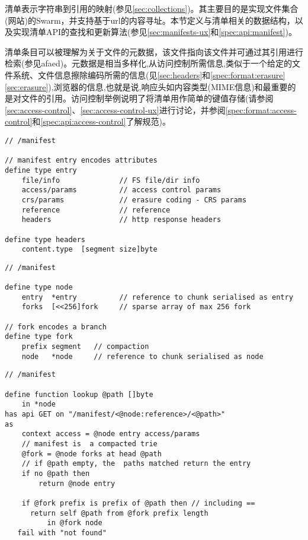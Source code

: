 清单表示字符串到引用的映射(参见\ref{sec:collections})。其主要目的是实现文件集合(网站)的Swarm，并支持基于url的内容寻址。本节定义与清单相关的数据结构，以及实现清单API的查找和更新算法(参见\ref{sec:manifests-ux}和\ref{spec:api:manifest})。

清单条目可以被理解为关于文件的元数据，该文件指向该文件并可通过其引用进行检索(参见afaed)。元数据是相当多样化,从访问控制所需信息,类似于一个给定的文件系统、文件信息擦除编码所需的信息(见\ref{sec:headers}和\ref{spec:format:erasure} \ref{sec:erasure}),浏览器的信息,也就是说,响应头如内容类型(MIME信息)和最重要的是对文件的引用。访问控制举例说明了将清单用作简单的键值存储(请参阅\ref{sec:access-control}、\ref{sec:access-control-ux}进行讨论，并参阅\ref{spec:format:access-control}和\ref{spec:api:access-control}了解规范)。

\begin{definition}\label{def:manifest-entry}
\begin{lstlisting}[language=buzz1]
// /manifest

// manifest entry encodes attributes 
define type entry 
    file/info              // FS file/dir info
    access/params          // access control params
    crs/params             // erasure coding - CRS params
    reference              // reference
    headers                // http response headers 

define type headers
    content.type  [segment size]byte

\end{lstlisting}
\end{definition}

\begin{definition}\label{def:manifests}
\begin{lstlisting}[language=buzz1]
// /manifest

define type node 
    entry  *entry          // reference to chunk serialised as entry
    forks  [<<256]fork     // sparse array of max 256 fork

// fork encodes a branch
define type fork 
    prefix segment   // compaction 
    node   *node     // reference to chunk serialised as node

\end{lstlisting}
\end{definition}

\begin{definition}\label{def:manifests-lookup}
\begin{lstlisting}[language=buzz1]
// /manifest

define function lookup @path []byte
    in *node
has api GET on "/manifest/<@node:reference>/<@path>"
as 
    context access = @node entry access/params 
    // manifest is  a compacted trie
    @fork = @node forks at head @path 
    // if @path empty, the  paths matched return the entry
    if no @path then 
        return @node entry

    if @fork prefix is prefix of @path then // including == 
      return self @path from @fork prefix length
          in @fork node 
   fail with "not found"

\end{lstlisting}
\end{definition}


